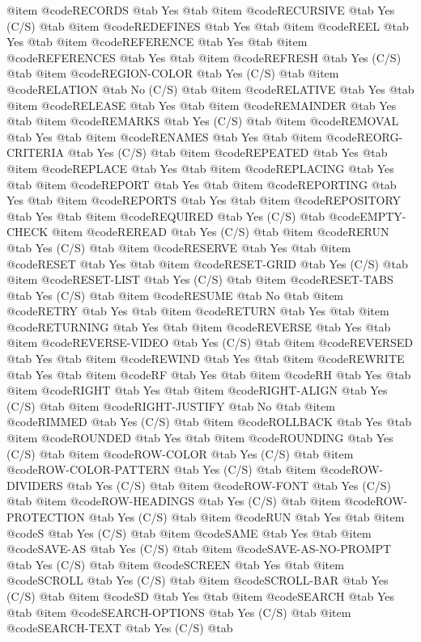 @item @code{RECORDS} @tab Yes @tab
@item @code{RECURSIVE} @tab Yes	(C/S) @tab
@item @code{REDEFINES} @tab Yes @tab
@item @code{REEL} @tab Yes @tab
@item @code{REFERENCE} @tab Yes @tab
@item @code{REFERENCES} @tab Yes @tab
@item @code{REFRESH} @tab Yes	(C/S) @tab
@item @code{REGION-COLOR} @tab Yes	(C/S) @tab
@item @code{RELATION} @tab No	(C/S) @tab
@item @code{RELATIVE} @tab Yes @tab
@item @code{RELEASE} @tab Yes @tab
@item @code{REMAINDER} @tab Yes @tab
@item @code{REMARKS} @tab Yes (C/S) @tab
@item @code{REMOVAL} @tab Yes @tab
@item @code{RENAMES} @tab Yes @tab
@item @code{REORG-CRITERIA} @tab Yes (C/S) @tab
@item @code{REPEATED} @tab Yes @tab
@item @code{REPLACE} @tab Yes @tab
@item @code{REPLACING} @tab Yes @tab
@item @code{REPORT} @tab Yes @tab
@item @code{REPORTING} @tab Yes @tab
@item @code{REPORTS} @tab Yes @tab
@item @code{REPOSITORY} @tab Yes @tab
@item @code{REQUIRED} @tab Yes	(C/S) @tab @code{EMPTY-CHECK}
@item @code{REREAD} @tab Yes (C/S) @tab
@item @code{RERUN} @tab Yes (C/S) @tab
@item @code{RESERVE} @tab Yes @tab
@item @code{RESET} @tab Yes @tab
@item @code{RESET-GRID} @tab Yes	(C/S) @tab
@item @code{RESET-LIST} @tab Yes	(C/S) @tab
@item @code{RESET-TABS} @tab Yes	(C/S) @tab
@item @code{RESUME} @tab No @tab
@item @code{RETRY} @tab Yes @tab
@item @code{RETURN} @tab Yes @tab
@item @code{RETURNING} @tab Yes @tab
@item @code{REVERSE} @tab Yes @tab
@item @code{REVERSE-VIDEO} @tab Yes	(C/S) @tab
@item @code{REVERSED} @tab Yes @tab
@item @code{REWIND} @tab Yes @tab
@item @code{REWRITE} @tab Yes @tab
@item @code{RF} @tab Yes @tab
@item @code{RH} @tab Yes @tab
@item @code{RIGHT} @tab Yes @tab
@item @code{RIGHT-ALIGN} @tab Yes	(C/S) @tab
@item @code{RIGHT-JUSTIFY} @tab No @tab
@item @code{RIMMED} @tab Yes	(C/S) @tab
@item @code{ROLLBACK} @tab Yes @tab
@item @code{ROUNDED} @tab Yes @tab
@item @code{ROUNDING} @tab Yes	(C/S) @tab
@item @code{ROW-COLOR} @tab Yes	(C/S) @tab
@item @code{ROW-COLOR-PATTERN} @tab Yes	(C/S) @tab
@item @code{ROW-DIVIDERS} @tab Yes	(C/S) @tab
@item @code{ROW-FONT} @tab Yes	(C/S) @tab
@item @code{ROW-HEADINGS} @tab Yes	(C/S) @tab
@item @code{ROW-PROTECTION} @tab Yes	(C/S) @tab
@item @code{RUN} @tab Yes @tab
@item @code{S} @tab Yes	(C/S) @tab
@item @code{SAME} @tab Yes @tab
@item @code{SAVE-AS} @tab Yes	(C/S) @tab
@item @code{SAVE-AS-NO-PROMPT} @tab Yes	(C/S) @tab
@item @code{SCREEN} @tab Yes @tab
@item @code{SCROLL} @tab Yes	(C/S) @tab
@item @code{SCROLL-BAR} @tab Yes	(C/S) @tab
@item @code{SD} @tab Yes @tab
@item @code{SEARCH} @tab Yes @tab
@item @code{SEARCH-OPTIONS} @tab Yes	(C/S) @tab
@item @code{SEARCH-TEXT} @tab Yes	(C/S) @tab
